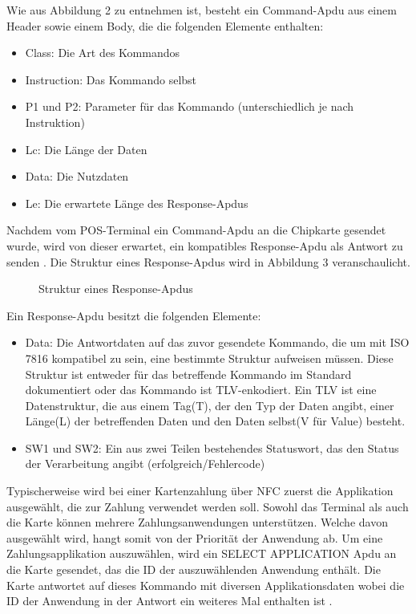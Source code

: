Wie aus Abbildung 2 zu entnehmen ist, besteht ein Command-Apdu aus einem Header sowie einem Body, die die folgenden Elemente enthalten: 

\begin{itemize}
	\item Class: Die Art des Kommandos
	\item Instruction: Das Kommando selbst
	\item P1 und P2: Parameter für das Kommando (unterschiedlich je nach Instruktion)
	\item Lc: Die Länge der Daten
	\item Data: Die Nutzdaten
	\item Le: Die erwartete Länge des Response-Apdus
\end{itemize}

Nachdem vom POS-Terminal ein Command-Apdu an die Chipkarte gesendet wurde, wird von dieser erwartet, ein kompatibles Response-Apdu als Antwort zu senden . Die Struktur eines Response-Apdus wird in Abbildung 3 veranschaulicht.

\begin{figure}[h]
	\caption{Struktur eines Response-Apdus}
\end{figure}

Ein Response-Apdu besitzt die folgenden Elemente:

\begin{itemize}
	\item Data: Die Antwortdaten auf das zuvor gesendete Kommando, die um mit ISO 7816 kompatibel zu sein, eine bestimmte Struktur aufweisen müssen. Diese Struktur ist entweder für das betreffende Kommando im Standard dokumentiert oder das Kommando ist TLV-enkodiert. Ein TLV ist eine Datenstruktur, die aus einem Tag(T), der den Typ der Daten angibt, einer Länge(L) der betreffenden Daten und den Daten selbst(V für Value) besteht. 
	\item SW1 und SW2: Ein aus zwei Teilen bestehendes Statuswort, das den Status der Verarbeitung angibt (erfolgreich/Fehlercode)
\end{itemize}

Typischerweise wird bei einer Kartenzahlung über NFC zuerst die Applikation ausgewählt, die zur Zahlung verwendet werden soll. Sowohl das Terminal als auch die Karte können mehrere Zahlungsanwendungen unterstützen. Welche davon ausgewählt wird, hangt somit von der Priorität der Anwendung ab. Um eine Zahlungsapplikation auszuwählen, wird ein SELECT APPLICATION Apdu an die Karte gesendet, das die ID der auszuwählenden Anwendung enthält. Die Karte antwortet auf dieses Kommando mit diversen Applikationsdaten wobei die ID der Anwendung in der Antwort ein weiteres Mal enthalten ist \cite{getInfoEmvJava, emvbook3}.

